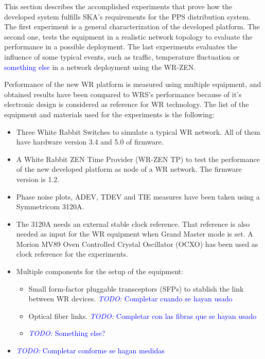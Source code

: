 
This section describes the accomplished experiments that prove how the developed system fulfills SKA's requirements for the PPS distribution system. The first experiment is a general characterization of the developed platform. The second one, tests the equipment in a realistic network topology to evaluate the performance in a possible deployment. The last experiments evaluates the influence of some typical events, such as traffic, temperature fluctuation or \textcolor{blue}{something else} in a network deployment using the WR-ZEN.

Performance of the new WR platform is measured using multiple equipment, and obtained results have been compared to WRS's performance because of it's electronic design is considered as reference for WR technology. The list of the equipment and materials used for the experiments is the following:

\begin{itemize}
    \item Three White Rabbit Switches to simulate a typical WR network. All of them have hardware version 3.4 and 5.0 of firmware.
    \item A White Rabbit ZEN Time Provider (WR-ZEN TP) to test the performance of the new developed platform as node of a WR network. The firmware version is 1.2.
    \item Phase noise plots, ADEV, TDEV and TIE measures have been taken using a Symmetricom 3120A.
    \item The 3120A needs an external stable clock reference. That reference is also needed as input for the WR equipment when Grand Master mode is set. A Morion MV89 Oven Controlled Crystal Oscillator (OCXO) has been used as clock reference for the experiments.
    \item Multiple components for the setup of the equipment:
    \begin{itemize}
        \item Small form-factor pluggable transceptors (SFPs) to stablish the link between WR devices.  \textcolor{blue}{\textit{TODO:} Completar cuando se hayan usado}
        \item Optical fiber links. \textcolor{blue}{\textit{TODO:} Completar con las fibras que se hayan usado}
        \item \textcolor{blue}{\textit{TODO:} Something else?}
    \end{itemize}
    \item \textcolor{blue}{\textit{TODO:} Completar conforme se hagan medidas}
\end{itemize}

